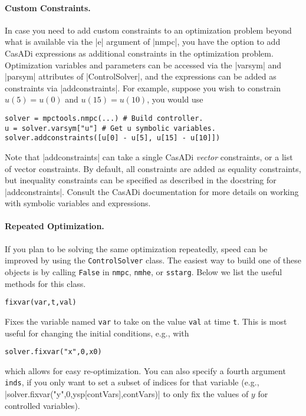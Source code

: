 \documentclass{article}
\providecommand{\lstinline}{}
\newcommand{\funcname}[2][.25em]{\vspace{#1}\noindent\texttt{#2}\nopagebreak\vspace{#1}}
\begin{document}
\begin{multicols}{2}
\paragraph*{Custom Constraints.}

In case you need to add custom constraints to an optimization problem beyond what is available via the \lstinline|e| argument of \lstinline|nmpc|, you have the option to add CasADi expressions as additional constraints in the optimization problem.
Optimization variables and parameters can be accessed via the \lstinline|varsym| and \lstinline|parsym| attributes of \lstinline|ControlSolver|, and the expressions can be added as constraints via \lstinline|addconstraints|.
For example, suppose you wish to constrain $u(5) = u(0)$ and $u(15) = u(10)$, you would use
%
\begin{lstlisting}[frame=L]
solver = mpctools.nmpc(...) # Build controller.
u = solver.varsym["u"] # Get u symbolic variables.
solver.addconstraints([u[0] - u[5], u[15] - u[10]])
\end{lstlisting}
%
Note that \lstinline|addconstraints| can take a single CasADi \emph{vector} constraints, or a list of vector constraints.
By default, all constraints are added as equality constraints, but inequality constraints can be specified as described in the docstring for \lstinline|addconstraints|.
Consult the CasADi documentation for more details on working with symbolic variables and expressions.

\paragraph*{Repeated Optimization.}

If you plan to be solving the same optimization repeatedly, speed can be improved by using the \texttt{ControlSolver} class.
The easiest way to build one of these objects is by calling \texttt{False} in \texttt{nmpc}, \texttt{nmhe}, or \texttt{sstarg}.
Below we list the useful methods for this class.

\funcname{fixvar(var,t,val)}

Fixes the variable named \texttt{var} to take on the value \texttt{val} at time \texttt{t}.
This is most useful for changing the initial conditions, e.g., with
%
\begin{lstlisting}[frame=L]
solver.fixvar("x",0,x0)
\end{lstlisting}
%
which allows for easy re-optimization.
You can also specify a fourth argument \texttt{inds}, if you only want to set a subset of indices for that variable (e.g., \lstinline|solver.fixvar("y",0,ysp[contVars],contVars)| to only fix the values of $y$ for controlled variables).


\end{multicols}
\end{document}
